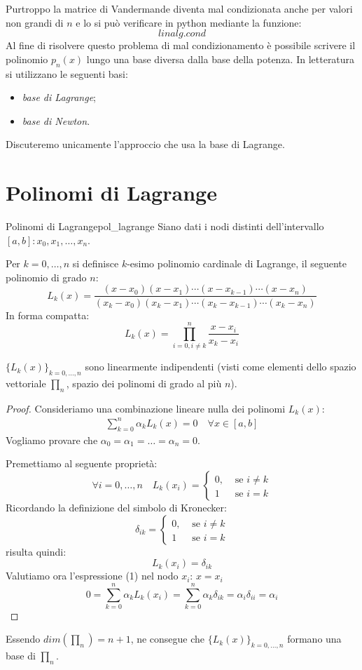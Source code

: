 \documentclass[12pt]{report}
\newcounter{definition}
\newcounter{proposition}
\newcommand{\nmu}{}
\begin{document}
Purtroppo la matrice di Vandermande diventa mal condizionata anche per valori non grandi di $n$ e lo si può verificare in python mediante la funzione:
\[
linalg.cond
\]
Al fine di risolvere questo problema di mal condizionamento è possibile scrivere il polinomio $p_n(x)$ lungo una base diversa dalla base della potenza. In letteratura si utilizzano le seguenti basi:
\begin{itemize}
	\item \textit{base di Lagrange};
	\item \textit{base di Newton}.
\end{itemize}
Discuteremo unicamente l'approccio che usa la base di Lagrange.
\section{Polinomi di Lagrange}
\begin{definition}{\nmu Polinomi di Lagrange}{pol_lagrange}
	Siano dati i nodi distinti dell'intervallo $[a, b]: x_0, x_1, \dots, x_n$.

	Per $k = 0, \dots, n$ si definisce $k$-esimo polinomio cardinale di Lagrange, il seguente polinomio di grado $n$:
	\[
	L_k(x) = \dfrac{(x-x_0)(x-x_1)\cdots(x-x_{k-1})\cdots(x - x_n)}{(x_k - x_0)(x_k - x_1)\cdots(x_k - x_{k-1})\cdots(x_k - x_n)}
	\]
	In forma compatta:
	\[
	L_k(x) = \prod_{i=0, i \neq k}^{n}\dfrac{x - x_i}{x_k - x_i}
	\]
\end{definition}
\begin{proposition}{}{}
$\{L_k(x)\}_{k=0,\dots, n}$ sono linearmente indipendenti (visti come elementi dello spazio vettoriale $\prod_n$, spazio dei polinomi di grado al più $n$).
\end{proposition}
\begin{proof}
	Consideriamo una combinazione lineare nulla dei polinomi $L_k(x)$:
	\begin{align}
	\displaystyle\sum_{k=0}^{n}\alpha_k L_k(x) = 0 \quad \forall x \in [a,b]
	\end{align}
	Vogliamo provare che $\alpha_0=\alpha_1 = \dots=\alpha_n = 0$.

	Premettiamo al seguente proprietà:
	\[
	\forall i = 0, \dots, n \quad L_k(x_i) = \begin{cases}
		0, &\text{ se } i \neq k \\
		1 &\text{ se } i  = k
	\end{cases}
	\]
	Ricordando la definizione del simbolo di Kronecker:
	\[
	\delta_{ik} = \begin{cases}
		0, &\text{ se }i \neq k\\
		1 &\text{ se }i=k
	\end{cases}
	\]
	risulta quindi:
	\[
	L_k(x_i) = \delta_{ik}
	\]
	Valutiamo ora l'espressione (1) nel nodo $x_i$: $x = x_i$
	\[
	0 = \displaystyle\sum_{k=0}^{n}\alpha_kL_k(x_i) = \displaystyle\sum_{k=0}^{n}\alpha_k \delta_{ik} = \alpha_i\delta_{ii} = \alpha_i
	\]
\end{proof}
Essendo $dim(\prod_n) = n+1$, ne consegue che $\{L_k(x)\}_{k=0,\dots, n}$ formano una base di $\prod_n$.
\end{document}
